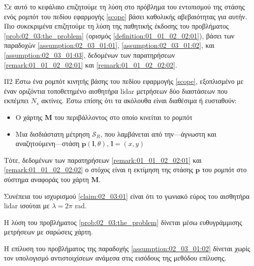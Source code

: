 Σε αυτό το κεφάλαιο επιζητούμε τη λύση στο πρόβλημα του εντοπισμού της στάσης
ενός ρομπότ του πεδίου εφαρμογής \ref{scope} βάσει καθολικής αβεβαιότητας για
αυτήν. Πιο συκεκριμένα επιζητούμε τη λύση της παθητικής έκδοσης του προβλήματος
\ref{prob:02_03:the_problem} (ορισμός \ref{definition:01_01_02_02:01}), βάσει
των παραδοχών \ref{assumption:02_03_01:01}, \ref{assumption:02_03_01:02}, και
\ref{assumption:02_03_01:03}, δεδομένων των παρατηρήσεων
\ref{remark:01_01_02_02:01} και \ref{remark:01_01_02_02:02}.

\begin{bw_box}
\begin{customproblem}{Π2}
  \label{prob:02_03:the_problem}
  Έστω ένα ρομπότ κινητής βάσης του πεδίου εφαρμογής \ref{scope}, εξοπλισμένο με
  έναν οριζόντια τοποθετημένο αισθητήρα lidar μετρήσεων δύο διαστάσεων που
  εκπέμπει $N_s$ ακτίνες. Έστω επίσης ότι τα ακόλουθα είναι διαθέσιμα ή
  ευσταθούν:
  \begin{itemize}
    \item Ο χάρτης $\bm{M}$ του περιβάλλοντος στο οποίο κινείται το ρομπότ
    \item Μια δισδιάστατη μέτρηση $\mathcal{S}_R$, που λαμβάνεται από
          την---άγνωστη και αναζητούμενη---στάση $\bm{p}(\bm{l},\theta)$,
          $\bm{l} = (x,y)$
  \end{itemize}
\end{customproblem}
Τότε, δεδομένων των παρατηρήσεων \ref{remark:01_01_02_02:01} και
\ref{remark:01_01_02_02:02} ο στόχος είναι η εκτίμηση της στάσης $\bm{p}$ του
ρομπότ στο σύστημα αναφοράς του χάρτη $\bm{M}$.
\end{bw_box}

\begin{bw_box}
  \begin{assumption}
    \label{assumption:02_03_01:01}
    Συνέπεια του ισχυρισμού \ref{claim:02_03:01} είναι ότι το γωνιακό εύρος του
    αισθητήρα lidar ισούται με $\lambda = 2\pi$ rad.
  \end{assumption}
\end{bw_box}

\begin{bw_box}
  \begin{assumption}
    \label{assumption:02_03_01:02}
    Η λύση του προβλήματος \ref{prob:02_03:the_problem} δίνεται μέσω
    ευθυγράμμισης μετρήσεων με σαρώσεις χάρτη.
  \end{assumption}
\end{bw_box}

\begin{bw_box}
  \begin{assumption}
    \label{assumption:02_03_01:03}
    Η επίλυση του προβλήματος της παραδοχής \ref{assumption:02_03_01:02}
    δίνεται χωρίς τον υπολογισμό αντιστοιχίσεων ανάμεσα στις εισόδους
    της μεθόδου επίλυσης.
  \end{assumption}
\end{bw_box}

